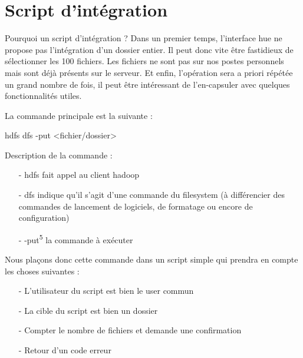 \section{Script d’intégration}

{\let\thefootnote\relax{}
}
{\let\thefootnote\relax{}
}
\par Pourquoi un script d’intégration ? Dans un premier temps, l’interface hue ne propose pas l’intégration d’un dossier entier. Il peut donc vite être fastidieux de sélectionner les 100 fichiers. Les fichiers ne sont pas sur nos postes personnels mais sont déjà présents sur le serveur. Et enfin, l’opération sera a priori répétée un grand nombre de fois, il peut être intéressant de l'en-capsuler avec quelques fonctionnalités utiles.

\par La commande principale est la suivante :

\begin{unix}{hdfs dfs -put <fichier/dossier>}\end{unix}

Description de la commande : 
\begin{itemize}
\item[-] hdfs fait appel au client hadoop
\item[-] dfs indique qu’il s’agit d’une commande du filesystem (à différencier des commandes de lancement de logiciels, de formatage ou encore de configuration)
\item[-] -put\textsuperscript{5} la commande à exécuter \newline
\end{itemize}

\par Nous plaçons donc cette commande dans un script simple qui prendra en compte les choses suivantes :
\begin{itemize}
\item[-] L’utilisateur du script est bien le user commun 
\item[-] La cible du script est bien un dossier
\item[-] Compter le nombre de fichiers et demande une confirmation
\item[-] Retour d’un code erreur
\end{itemize}

